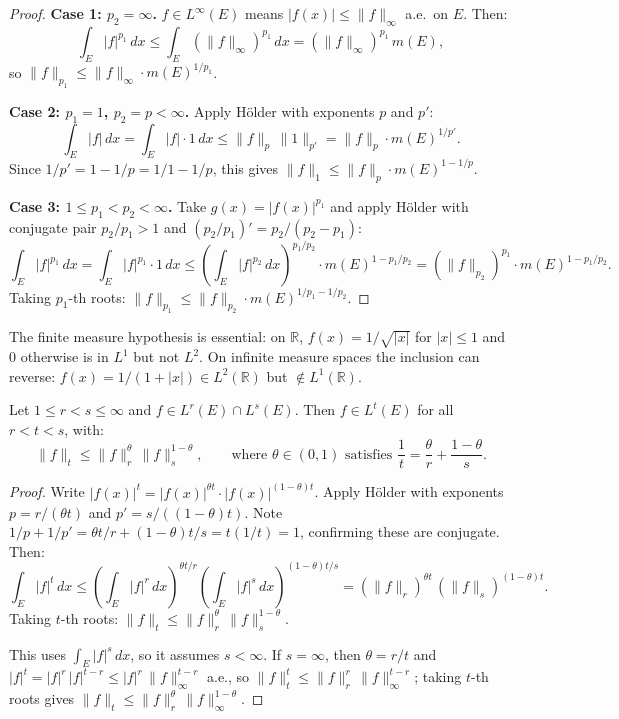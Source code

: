 \documentclass[11pt]{report}
\begin{document}
\begin{proof}\leavevmode

\textbf{Case 1: $p_2 = \infty$.} $f \in L^\infty(E)$ means $|f(x)| \leq \|f\|_\infty$ a.e.\ on $E$. Then:
\[
\int_E |f|^{p_1}\,dx \leq \int_E (\|f\|_\infty)^{p_1}\,dx = (\|f\|_\infty)^{p_1}\,m(E),
\]
so $\|f\|_{p_1} \leq \|f\|_\infty \cdot m(E)^{1/p_1}$.

\textbf{Case 2: $p_1 = 1$, $p_2 = p < \infty$.} Apply H\"older with exponents $p$ and $p'$:
\[
\int_E |f|\,dx = \int_E |f| \cdot 1\,dx \leq \|f\|_p\,\|1\|_{p'} = \|f\|_p \cdot m(E)^{1/p'}.
\]
Since $1/p' = 1 - 1/p = 1/1 - 1/p$, this gives $\|f\|_1 \leq \|f\|_p \cdot m(E)^{1 - 1/p}$.

\textbf{Case 3: $1 \leq p_1 < p_2 < \infty$.} Take $g(x) = |f(x)|^{p_1}$ and apply H\"older with conjugate pair $p_2/p_1 > 1$ and $(p_2/p_1)' = p_2/(p_2 - p_1)$:
\[
\int_E |f|^{p_1}\,dx = \int_E |f|^{p_1} \cdot 1\,dx \leq \left(\int_E |f|^{p_2}\,dx\right)^{p_1/p_2} \cdot m(E)^{1 - p_1/p_2} = (\|f\|_{p_2})^{p_1} \cdot m(E)^{1 - p_1/p_2}.
\]
Taking $p_1$-th roots: $\|f\|_{p_1} \leq \|f\|_{p_2} \cdot m(E)^{1/p_1 - 1/p_2}$.
\end{proof}

\begin{rembox}
The finite measure hypothesis is essential: on $\mathbb{R}$, $f(x) = 1/\sqrt{|x|}$ for $|x| \leq 1$ and $0$ otherwise is in $L^1$ but not $L^2$. On infinite measure spaces the inclusion can reverse: $f(x) = 1/(1 + |x|) \in L^2(\mathbb{R})$ but $\notin L^1(\mathbb{R})$.
\end{rembox}

\begin{propbox}
Let $1 \leq r < s \leq \infty$ and $f \in L^r(E) \cap L^s(E)$. Then $f \in L^t(E)$ for all $r < t < s$, with:
\[
\|f\|_t \leq \|f\|_r^{\theta}\,\|f\|_s^{1-\theta}, \qquad \text{where } \theta \in (0, 1) \text{ satisfies } \frac{1}{t} = \frac{\theta}{r} + \frac{1-\theta}{s}.
\]
\end{propbox}

\begin{proof}
Write $|f(x)|^t = |f(x)|^{\theta t} \cdot |f(x)|^{(1-\theta)t}$. Apply H\"older with exponents $p = r/(\theta t)$ and $p' = s/((1-\theta)t)$. Note $1/p + 1/p' = \theta t/r + (1-\theta)t/s = t(1/t) = 1$, confirming these are conjugate. Then:
\[
\int_E |f|^t\,dx \leq \left(\int_E |f|^r\,dx\right)^{\theta t/r} \left(\int_E |f|^s\,dx\right)^{(1-\theta)t/s} = (\|f\|_r)^{\theta t}\,(\|f\|_s)^{(1-\theta)t}.
\]
Taking $t$-th roots: $\|f\|_t \leq \|f\|_r^{\theta}\,\|f\|_s^{1-\theta}$.

This uses $\int_E |f|^s\,dx$, so it assumes $s < \infty$. If $s = \infty$, then $\theta = r/t$ and $|f|^t = |f|^r\,|f|^{t-r} \leq |f|^r\,\|f\|_\infty^{t-r}$ a.e., so $\|f\|_t^t \leq \|f\|_r^r\,\|f\|_\infty^{t-r}$; taking $t$-th roots gives $\|f\|_t \leq \|f\|_r^{\theta}\,\|f\|_\infty^{1-\theta}$.
\end{proof}
\end{document}
